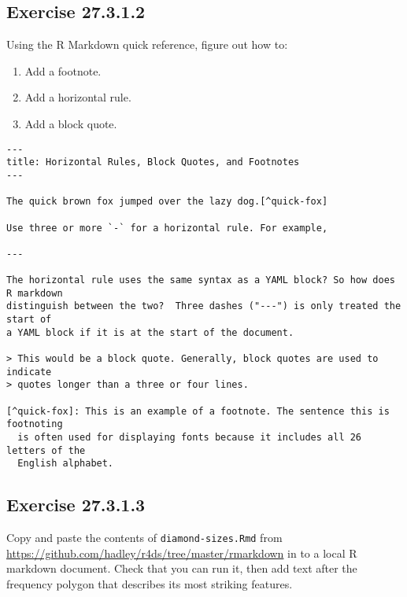 \documentclass[]{book}
\providecommand{\tightlist}{%
  \setlength{\itemsep}{0pt}\setlength{\parskip}{0pt}}
\theoremstyle{plain}
\theoremstyle{remark}
\begin{document}
\hypertarget{exercise-27.3.1.2}{%
\subsection*{\texorpdfstring{Exercise
{27.3.1.2}}{Exercise 27.3.1.2}}\label{exercise-27.3.1.2}}

Using the R Markdown quick reference, figure out how to:

\begin{enumerate}
\def\labelenumi{\arabic{enumi}.}
\tightlist
\item
  Add a footnote.
\item
  Add a horizontal rule.
\item
  Add a block quote.
\end{enumerate}

\begin{verbatim}
---
title: Horizontal Rules, Block Quotes, and Footnotes
---

The quick brown fox jumped over the lazy dog.[^quick-fox]

Use three or more `-` for a horizontal rule. For example,

---

The horizontal rule uses the same syntax as a YAML block? So how does R markdown
distinguish between the two?  Three dashes ("---") is only treated the start of
a YAML block if it is at the start of the document.

> This would be a block quote. Generally, block quotes are used to indicate
> quotes longer than a three or four lines.

[^quick-fox]: This is an example of a footnote. The sentence this is footnoting
  is often used for displaying fonts because it includes all 26 letters of the
  English alphabet.
\end{verbatim}

\hypertarget{exercise-27.3.1.3}{%
\subsection*{\texorpdfstring{Exercise
{27.3.1.3}}{Exercise 27.3.1.3}}\label{exercise-27.3.1.3}}

Copy and paste the contents of \texttt{diamond-sizes.Rmd} from
\url{https://github.com/hadley/r4ds/tree/master/rmarkdown} in to a local
R markdown document. Check that you can run it, then add text after the
frequency polygon that describes its most striking features.
\end{document}
